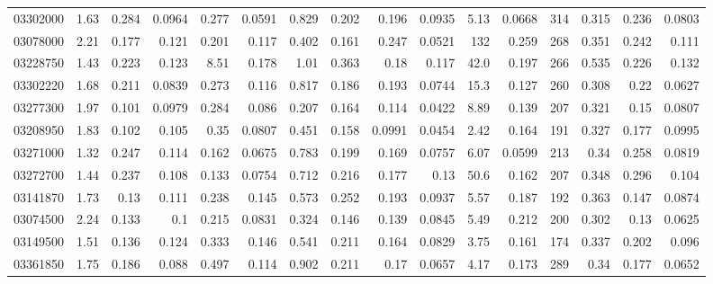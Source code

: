 \begin{longtable}{l r rr rr rr rr rr rr rr}
03302000 & 1.63 & 0.284 & {0.0964} & 0.277 & {0.0591} & 0.829 & {0.202} & 0.196 & {0.0935} & 5.13 & {0.0668} & 314 & {0.315} & 0.236 & {0.0803}\\
03078000 & 2.21 & 0.177 & {0.121} & 0.201 & {0.117} & 0.402 & {0.161} & 0.247 & {0.0521} & 132 & {0.259} & 268 & {0.351} & 0.242 & {0.111}\\
03228750 & 1.43 & 0.223 & {0.123} & 8.51 & {0.178} & 1.01 & {0.363} & 0.18 & {0.117} & 42.0 & {0.197} & 266 & {0.535} & 0.226 & {0.132}\\
03302220 & 1.68 & 0.211 & {0.0839} & 0.273 & {0.116} & 0.817 & {0.186} & 0.193 & {0.0744} & 15.3 & {0.127} & 260 & {0.308} & 0.22 & {0.0627}\\
03277300 & 1.97 & 0.101 & {0.0979} & 0.284 & {0.086} & 0.207 & {0.164} & 0.114 & {0.0422} & 8.89 & {0.139} & 207 & {0.321} & 0.15 & {0.0807}\\
03208950 & 1.83 & 0.102 & 0.105 & 0.35 & {0.0807} & 0.451 & {0.158} & 0.0991 & {0.0454} & 2.42 & {0.164} & 191 & {0.327} & 0.177 & {0.0995}\\
03271000 & 1.32 & 0.247 & {0.114} & 0.162 & {0.0675} & 0.783 & {0.199} & 0.169 & {0.0757} & 6.07 & {0.0599} & 213 & {0.34} & 0.258 & {0.0819}\\
03272700 & 1.44 & 0.237 & {0.108} & 0.133 & {0.0754} & 0.712 & {0.216} & 0.177 & {0.13} & 50.6 & {0.162} & 207 & {0.348} & 0.296 & {0.104}\\
03141870 & 1.73 & 0.13 & {0.111} & 0.238 & {0.145} & 0.573 & {0.252} & 0.193 & {0.0937} & 5.57 & {0.187} & 192 & {0.363} & 0.147 & {0.0874}\\
03074500 & 2.24 & 0.133 & {0.1} & 0.215 & {0.0831} & 0.324 & {0.146} & 0.139 & {0.0845} & 5.49 & {0.212} & 200 & {0.302} & 0.13 & {0.0625}\\
03149500 & 1.51 & 0.136 & {0.124} & 0.333 & {0.146} & 0.541 & {0.211} & 0.164 & {0.0829} & 3.75 & {0.161} & 174 & {0.337} & 0.202 & {0.096}\\
03361850 & 1.75 & 0.186 & {0.088} & 0.497 & {0.114} & 0.902 & {0.211} & 0.17 & {0.0657} & 4.17 & {0.173} & 289 & {0.34} & 0.177 & {0.0652}\\
\end{longtable}
